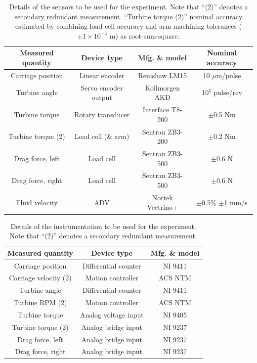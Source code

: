 \documentclass[12pt,letterpaper]{scrreprt}
\begin{document}
\begin{table}[ht]
\centering
\begin{tabular}{c|c|c|c}
Measured quantity & Device type & Mfg. \& model & Nominal accuracy \\
\hline 
Carriage position & Linear encoder & Renishaw LM15 & 10 $\mu$m/pulse \cite{RenishawLM15}\\
Turbine angle & Servo encoder output & Kollmorgen AKD & 10$^5$ pulse/rev \cite{KollmorgenAKD}\\
Turbine torque & Rotary transducer & Interface T8-200 & $\pm$0.5 Nm \cite{InterfaceT8}\\ 
Turbine torque (2) & Load cell (\& arm) & Sentran ZB3-200 & $\pm$0.2 Nm \cite{SentranZB}\\
Drag force, left & Load cell & Sentran ZB3-500 & $\pm$0.6 N \cite{SentranZB}\\
Drag force, right & Load cell & Sentran ZB3-500 & $\pm$0.6 N \cite{SentranZB}\\
Fluid velocity & ADV & Nortek Vectrino+ & $\pm$0.5\% $\pm$1 mm/s \cite{NortekVectrino}\\
\end{tabular}
\caption{Details of the sensors to be used for the experiment. Note that ``(2)''
denotes a secondary redundant measurement. ``Turbine torque (2)'' nominal
accuracy estimated by combining load cell accuracy and arm machining tolerances
($\pm 1 \times 10^{-4}$ m) as root-sum-square.} \label{tab-sensors}
\end{table}

\begin{table}[ht]
\centering
\begin{tabular}{c|c|c}
Measured quantity & Device type & Mfg. \& model \\
\hline 
Carriage position & Differential counter & NI 9411 \\
Carriage velocity (2) & Motion controller & ACS NTM \\
Turbine angle & Differential counter & NI 9411 \\
Turbine RPM (2) & Motion controller & ACS NTM \\
Turbine torque & Analog voltage input & NI 9405 \\ 
Turbine torque (2) & Analog bridge input & NI 9237 \\
Drag force, left & Analog bridge input & NI 9237 \\
Drag force, right & Analog bridge input & NI 9237 \\
\end{tabular}
\caption{Details of the instrumentation to be used for the experiment. Note that
``(2)'' denotes a secondary redundant measurement.}
\label{tab-instrumentation}
\end{table}
\end{document}
